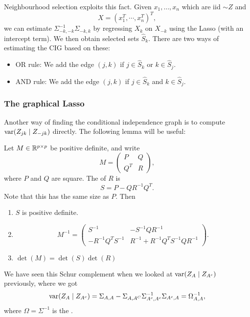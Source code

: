 \documentclass[a4paper]{article}
\begin{document}
Neighbourhood selection exploits this fact. Given $x_1, \ldots, x_n$ which are iid $\sim Z$ and
\[
  X = (x_1^T, \cdots, x_n^T)^T,
\]
we can estimate $\Sigma_{-k, -k}^{-1} \Sigma_{-k, k}$ by regressing $X_k$ on $X_{-k}$ using the Lasso (with an intercept term). We then obtain selected sets $\hat{S}_k$. There are two ways of estimating the CIG based on these:
\begin{itemize}
  \item OR rule: We add the edge $(j, k)$ if $j \in \hat{S}_k$ or $k \in \hat{S}_j$.
  \item AND rule: We add the edge $(j, k)$ if $j \in \hat{S}_k$ and $k \in \hat{S}_j$.
\end{itemize}

\subsubsection*{The graphical Lasso}
Another way of finding the conditional independence graph is to compute $\operatorname{var}(Z_{jk} \mid Z_{-jk})$ directly. The following lemma will be useful:

\begin{lemma}
  Let $M \in \mathbb{R}^{p \times p}$ be positive definite, and write
  \[
    M =
    \begin{pmatrix}
      P & Q\\
      Q^T & R
    \end{pmatrix},
  \]
  where $P$ and $Q$ are square. The  of $R$ is
  \[
    S = P - QR^{-1} Q^T.
  \]
  Note that this has the same size as $P$. Then
  \begin{enumerate}
    \item $S$ is positive definite.
    \item
      \[
        M^{-1} =
        \begin{pmatrix}
          S^{-1} & -S^{-1} QR^{-1}\\
          -R^{-1} Q^T S^{-1} & R^{-1} + R^{-1} Q^T S^{-1} Q R^{-1}
        \end{pmatrix}.
      \]
    \item $\det(M) = \det (S) \det (R)$
  \end{enumerate}
\end{lemma}
We have seen this Schur complement when we looked at $\operatorname{var}(Z_A \mid Z_{A^c})$ previously, where we got
\[
  \operatorname{var}(Z_A \mid Z_{A^c}) = \Sigma_{A, A} - \Sigma_{A, A^C} \Sigma_{A^c, A^c}^{-1} \Sigma_{A^c, A} = \Omega_{A, A}^{-1},
\]
where $\Omega = \Sigma^{-1}$ is the .
\end{document}
